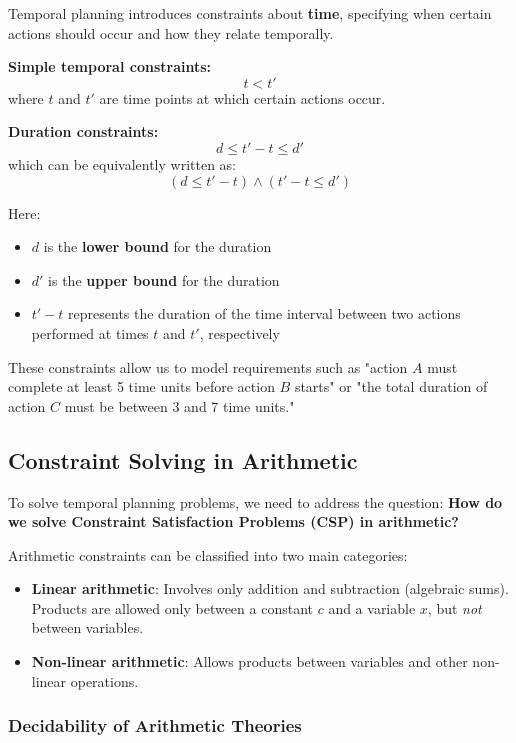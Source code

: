 \documentclass[11pt,a4paper]{article}
\theoremstyle{definition}
\theoremstyle{plain}
\theoremstyle{remark}
\begin{document}
Temporal planning introduces constraints about \textbf{time}, specifying when certain actions should occur and how they relate temporally.

\textbf{Simple temporal constraints:}
\[
t < t'
\]
where $t$ and $t'$ are time points at which certain actions occur.

\textbf{Duration constraints:}
\[
d \leq t' - t \leq d'
\]
which can be equivalently written as:
\[
(d \leq t' - t) \land (t' - t \leq d')
\]

Here:
\begin{itemize}
    \item $d$ is the \textbf{lower bound} for the duration
    \item $d'$ is the \textbf{upper bound} for the duration
    \item $t' - t$ represents the duration of the time interval between two actions performed at times $t$ and $t'$, respectively
\end{itemize}

These constraints allow us to model requirements such as "action $A$ must complete at least 5 time units before action $B$ starts" or "the total duration of action $C$ must be between 3 and 7 time units."

\subsection{Constraint Solving in Arithmetic}

To solve temporal planning problems, we need to address the question: \textbf{How do we solve Constraint Satisfaction Problems (CSP) in arithmetic?}

Arithmetic constraints can be classified into two main categories:

\begin{itemize}
    \item \textbf{Linear arithmetic}: Involves only addition and subtraction (algebraic sums). Products are allowed only between a constant $c$ and a variable $x$, but \textit{not} between variables.
    
    \item \textbf{Non-linear arithmetic}: Allows products between variables and other non-linear operations.
\end{itemize}

\subsubsection{Decidability of Arithmetic Theories}
\end{document}
